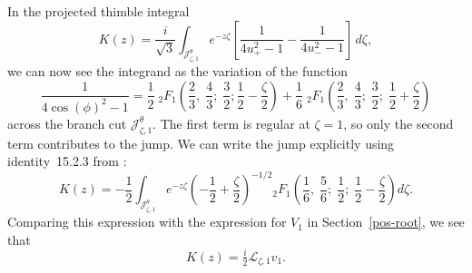 \documentclass{article}
\newcommand{\laplace}{\mathcal{L}}
\theoremstyle{definition}
\theoremstyle{plain}
\begin{document}
In the projected thimble integral
\[ K(z) = \frac{i}{\sqrt{3}} \int_{\mathcal{J}^\theta_{\zeta, 1}} e^{-z\zeta}\left[\frac{1}{4u_+^2 - 1} - \frac{1}{4u_-^2 - 1}\right]\,d\zeta, \]
we can now see the integrand as the variation of the function
\[ \frac{1}{4\cos(\phi)^2 - 1} = \frac{1}{2}\;{}_2F_1\left(\frac{2}{3},\;\frac{4}{3};\;\frac{3}{2};\frac{1}{2} - \frac{\zeta}{2}\right) + \frac{1}{6}\;{}_2F_1\left(\frac{2}{3},\;\frac{4}{3};\;\frac{3}{2};\;\frac{1}{2} + \frac{\zeta}{2}\right) \]
across the branch cut $\mathcal{J}^\theta_{\zeta,1}$. The first term is regular at $\zeta = 1$, so only the second term contributes to the jump. We can write the jump explicitly using identity~15.2.3 from \cite{dlmf}:
\[ K(z) = -\frac{1}{2} \int_{\mathcal{J}^\theta_{\zeta, 1}} e^{-z\zeta} \left(-\frac{1}{2}+\frac{\zeta}{2}\right)^{-1/2} {}_2F_1\left(\frac{1}{6},\;\frac{5}{6};\;\frac{1}{2};\;\frac{1}{2} - \frac{\zeta}{2}\right) d\zeta. \]
Comparing this expression with the expression for $V_1$ in Section~\ref{pos-root}, we see that
\[ K(z) = \tfrac{i}{2}\laplace_{\zeta, 1} v_1. \]
%
\end{document}
